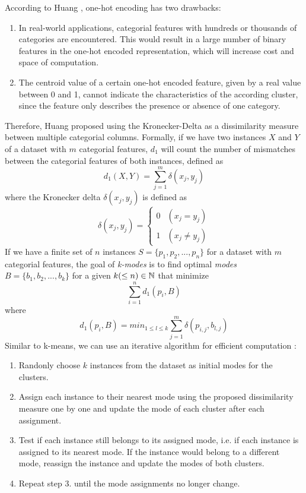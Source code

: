 According to Huang \cite{kmodes}, one-hot encoding has two drawbacks:
\begin{enumerate} 
	\item In real-world applications, categorial features with hundreds or thousands of categories are encountered. This would result in a large number of binary features in the one-hot encoded representation, which will increase cost and space of computation.
	\item The centroid value of a certain one-hot encoded feature, given by a real value between 0 and 1, cannot indicate the characteristics of the according cluster, since the feature only describes the presence or absence of one category.
\end{enumerate}
Therefore, Huang \cite{kmodes} proposed using the Kronecker-Delta as a dissimilarity measure between multiple categorial columns. Formally, if we have two instances $X$ and $Y$ of a dataset with $m$ categorial features, $d_1$ will count the number of mismatches between the categorial features of both instances, defined as
$$d_1(X, Y) = \sum^m_{j=1} \delta (x_j, y_j)$$
where the Kronecker delta $\delta (x_j, y_j)$ is defined as
$$\delta (x_j, y_j) = 
\begin{cases}
    0 & (x_j = y_j)\\
    1 & (x_j \neq y_j)
\end{cases}
$$
If we have a finite set of $n$ instances $S=\{p_1, p_2, ..., p_n\}$ for a dataset with $m$ categorial features, the goal of \textit{k-modes} \cite{kmodes} is to find optimal \textit{modes} $B=\{b_1, b_2, ..., b_k\}$ for a given $k (\leq n) \in \mathbb{N}$ that minimize
$$\sum_{i=1}^n  d_1(p_i, B)$$
where
$$d_1(p_i, B) = min_{1 \leq l \leq k} \sum^m_{j=1} \delta (p_{i,j}, b_{l,j})$$
Similar to k-means, we can use an iterative algorithm for efficient computation \cite{kmodes}:
\begin{enumerate} 
	\item Randonly choose $k$ instances from the dataset as initial modes for the clusters.
	\item Assign each instance to their nearest mode using the proposed dissimilarity measure one by one and update the mode of each cluster after each assignment.
	\item Test if each instance still belongs to its assigned mode, i.e. if each instance is assigned to its nearest mode. If the instance would belong to a different mode, reassign the instance and update the modes of both clusters.
	\item Repeat step 3. until the mode assignments no longer change.
\end{enumerate}

